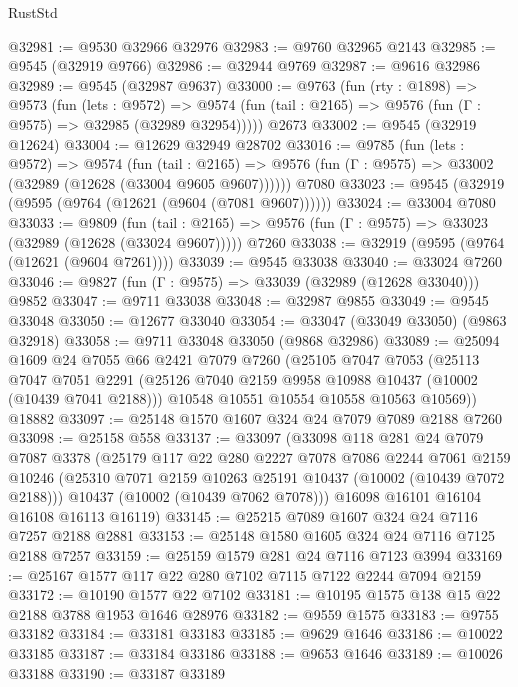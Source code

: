 \begin{lexlean}{RustStd}
\begin{coremodule}
@32981 := @9530 @32966 @32976
@32983 := @9760 @32965 @2143
@32985 := @9545 (@32919 @9766)
@32986 := @32944 @9769
@32987 := @9616 @32986
@32989 := @9545 (@32987 @9637)
@33000 := @9763
    (fun (rty : @1898) =>
    @9573
      (fun (lets : @9572) =>
      @9574 (fun (tail : @2165) => @9576 (fun (Γ : @9575) => @32985 (@32989 @32954)))))
    @2673
@33002 := @9545 (@32919 @12624)
@33004 := @12629 @32949 @28702
@33016 := @9785
    (fun (lets : @9572) =>
    @9574
      (fun (tail : @2165) =>
      @9576 (fun (Γ : @9575) => @33002 (@32989 (@12628 (@33004 @9605 @9607))))))
    @7080
@33023 := @9545 (@32919 (@9595 (@9764 (@12621 (@9604 (@7081 @9607))))))
@33024 := @33004 @7080
@33033 := @9809
    (fun (tail : @2165) => @9576 (fun (Γ : @9575) => @33023 (@32989 (@12628 (@33024 @9607)))))
    @7260
@33038 := @32919 (@9595 (@9764 (@12621 (@9604 @7261))))
@33039 := @9545 @33038
@33040 := @33024 @7260
@33046 := @9827 (fun (Γ : @9575) => @33039 (@32989 (@12628 @33040))) @9852
@33047 := @9711 @33038
@33048 := @32987 @9855
@33049 := @9545 @33048
@33050 := @12677 @33040
@33054 := @33047 (@33049 @33050) (@9863 @32918)
@33058 := @9711 @33048 @33050 (@9868 @32986)
@33089 := @25094
    @1609
    @24
    @7055
    @66
    @2421
    @7079
    @7260
    (@25105
      @7047
      @7053
      (@25113
        @7047
        @7051
        @2291
        (@25126 @7040 @2159 @9958 @10988 @10437 (@10002 (@10439 @7041 @2188)))
        @10548
        @10551
        @10554
        @10558
        @10563
        @10569))
    @18882
@33097 := @25148 @1570 @1607 @324 @24 @7079 @7089 @2188 @7260
@33098 := @25158 @558
@33137 := @33097
    (@33098
      @118
      @281
      @24
      @7079
      @7087
      @3378
      (@25179
        @117
        @22
        @280
        @2227
        @7078
        @7086
        @2244
        @7061
        @2159
        @10246
        (@25310 @7071 @2159 @10263 @25191 @10437 (@10002 (@10439 @7072 @2188)))
        @10437
        (@10002 (@10439 @7062 @7078)))
      @16098
      @16101
      @16104
      @16108
      @16113
      @16119)
@33145 := @25215 @7089 @1607 @324 @24 @7116 @7257 @2188 @2881
@33153 := @25148 @1580 @1605 @324 @24 @7116 @7125 @2188 @7257
@33159 := @25159 @1579 @281 @24 @7116 @7123 @3994
@33169 := @25167 @1577 @117 @22 @280 @7102 @7115 @7122 @2244 @7094 @2159
@33172 := @10190 @1577 @22 @7102
@33181 := @10195 @1575 @138 @15 @22 @2188 @3788 @1953 @1646 @28976
@33182 := @9559 @1575
@33183 := @9755 @33182
@33184 := @33181 @33183
@33185 := @9629 @1646
@33186 := @10022 @33185
@33187 := @33184 @33186
@33188 := @9653 @1646
@33189 := @10026 @33188
@33190 := @33187 @33189

\end{coremodule}
\end{lexlean}
